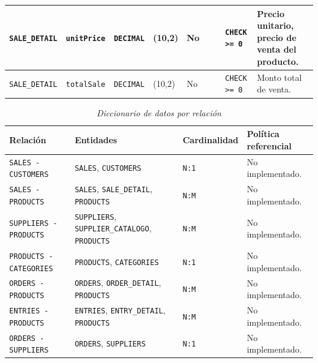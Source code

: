 \documentclass[11pt]{article}
\begin{document}
\begin{landscape}
\begin{xltabular}{\textheight}{
    | p{3.1cm} 
    | p{2.0cm} 
    | p{1.5cm} 
    | p{1.4cm} 
    | p{0.9cm} 
    | p{3.0cm} 
    | p{3.0cm} 
    | p{2.0cm} 
    | p{3.5cm} |
}
    \midrule
    \texttt{SALE\_DETAIL}       & \texttt{unitPrice}   & \texttt{DECIMAL}   & (10,2)               & No   &                                                                &                   & \texttt{CHECK >= 0}    & Precio unitario, precio de venta del producto. \\
    \midrule
    \texttt{SALE\_DETAIL}       & \texttt{totalSale}   & \texttt{DECIMAL}   & (10,2)               & No   &                                                                &                   & \texttt{CHECK >= 0}    & Monto total de venta. \\                  
\end{xltabular}
\endgroup
\end{landscape}

\begin{table}[!htb]
\centering
\caption{\textit{Diccionario de datos por relación}}
\label{tab:diccionario-relacion}
\begin{tabular}{
    | p{3.3cm}
    | p{4.0cm}
    | p{3.4cm}
    | p{3.5cm} |
}
    \toprule
    \textbf{Relación}              & \textbf{Entidades}                                                 & \textbf{Cardinalidad} & \textbf{Política referencial} \\
    \midrule
    \texttt{SALES - CUSTOMERS}     & \texttt{SALES}, \texttt{CUSTOMERS}                                 & \texttt{N:1}        & No implementado. \\
    \midrule
    \texttt{SALES - PRODUCTS}      & \texttt{SALES}, \texttt{SALE\_DETAIL}, \texttt{PRODUCTS}           & \texttt{N:M}        & No implementado. \\
    \midrule
    \texttt{SUPPLIERS - PRODUCTS}  & \texttt{SUPPLIERS}, \texttt{SUPPLIER\_CATALOGO}, \texttt{PRODUCTS} & \texttt{N:M}        & No implementado. \\
    \midrule
    \texttt{PRODUCTS - CATEGORIES} & \texttt{PRODUCTS}, \texttt{CATEGORIES}                             & \texttt{N:1}        & No implementado. \\
    \midrule
    \texttt{ORDERS - PRODUCTS}     & \texttt{ORDERS}, \texttt{ORDER\_DETAIL}, \texttt{PRODUCTS}         & \texttt{N:M}        & No implementado. \\
    \midrule
    \texttt{ENTRIES - PRODUCTS}    & \texttt{ENTRIES}, \texttt{ENTRY\_DETAIL}, \texttt{PRODUCTS}        & \texttt{N:M}        & No implementado. \\
    \midrule
    \texttt{ORDERS - SUPPLIERS}    & \texttt{ORDERS}, \texttt{SUPPLIERS}                                & \texttt{N:1}        & No implementado. \\

\end{tabular}
\end{table}
\end{document}
